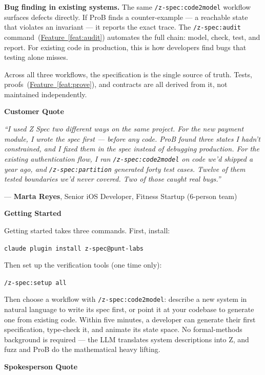 \documentclass[11pt,letterpaper]{article}
\newcommand{\prsection}[1]{%
  \vspace{1em}%
  {\large\bfseries\color{SectionBlue}#1}%
  \vspace{0.3em}\par%
}
\newcommand{\featureref}[1]{\hyperref[#1]{Feature~\ref*{#1}}}
\begin{document}
\textbf{Bug finding in existing systems.} The same {\small\texttt{/z-spec:code2model}} workflow surfaces defects directly. If ProB finds a counter-example --- a reachable state that violates an invariant --- it reports the exact trace. The {\small\texttt{/z-spec:audit}} command~(\featureref{feat:audit}) automates the full chain: model, check, test, and report. For existing code in production, this is how developers find bugs that testing alone misses.

Across all three workflows, the specification is the single source of truth. Tests, proofs~(\featureref{feat:prove}), and contracts are all derived from it, not maintained independently.

\prsection{Customer Quote}

\begin{customerquote}
\textit{``I used Z Spec two different ways on the same project. For the new payment module, I wrote the spec first --- before any code. ProB found three states I hadn't constrained, and I fixed them in the spec instead of debugging production. For the existing authentication flow, I ran \texttt{/z-spec:code2model} on code we'd shipped a year ago, and \texttt{/z-spec:partition} generated forty test cases. Twelve of them tested boundaries we'd never covered. Two of those caught real bugs.''}

\raggedleft --- \textbf{Marta Reyes}, Senior iOS Developer, Fitness Startup (6-person team)
\end{customerquote}

\prsection{Getting Started}

Getting started takes three commands. First, install:

{\small\texttt{claude plugin install z-spec@punt-labs}}

\noindent Then set up the verification tools (one time only):

{\small\texttt{/z-spec:setup all}}

\noindent Then choose a workflow with {\small\texttt{/z-spec:code2model}}: describe a new system in natural language to write its spec first, or point it at your codebase to generate one from existing code.
Within five minutes, a developer can generate their first specification, type-check it, and animate its state space. No formal-methods background is required --- the LLM translates system descriptions into Z, and fuzz and ProB do the mathematical heavy lifting.

\prsection{Spokesperson Quote}
\end{document}
